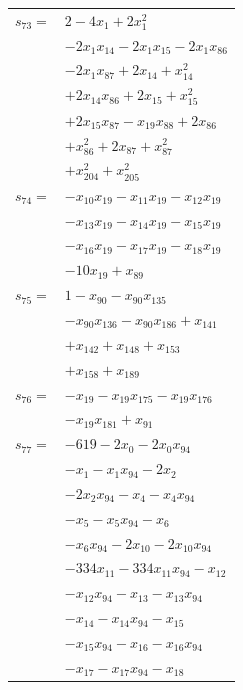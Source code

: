 \begin{longtable}{@{}r@{\;}l@{}}
\(s_{73}=\) & \(\displaystyle 2 -4x_{1} +2x_{1}^{2}\) \\
 & \(\displaystyle -2x_{1}x_{14} -2x_{1}x_{15} -2x_{1}x_{86}\) \\
 & \(\displaystyle -2x_{1}x_{87} +2x_{14} +x_{14}^{2}\) \\
 & \(\displaystyle +2x_{14}x_{86} +2x_{15} +x_{15}^{2}\) \\
 & \(\displaystyle +2x_{15}x_{87} -x_{19}x_{88} +2x_{86}\) \\
 & \(\displaystyle +x_{86}^{2} +2x_{87} +x_{87}^{2}\) \\
 & \(\displaystyle +x_{204}^{2} +x_{205}^{2}\) \\[3pt]
\(s_{74}=\) & \(\displaystyle -x_{10}x_{19} -x_{11}x_{19} -x_{12}x_{19}\) \\
 & \(\displaystyle -x_{13}x_{19} -x_{14}x_{19} -x_{15}x_{19}\) \\
 & \(\displaystyle -x_{16}x_{19} -x_{17}x_{19} -x_{18}x_{19}\) \\
 & \(\displaystyle -10x_{19} +x_{89}\) \\[3pt]
\(s_{75}=\) & \(\displaystyle 1 -x_{90} -x_{90}x_{135}\) \\
 & \(\displaystyle -x_{90}x_{136} -x_{90}x_{186} +x_{141}\) \\
 & \(\displaystyle +x_{142} +x_{148} +x_{153}\) \\
 & \(\displaystyle +x_{158} +x_{189}\) \\[3pt]
\(s_{76}=\) & \(\displaystyle -x_{19} -x_{19}x_{175} -x_{19}x_{176}\) \\
 & \(\displaystyle -x_{19}x_{181} +x_{91}\) \\[3pt]
\(s_{77}=\) & \(\displaystyle -619 -2x_{0} -2x_{0}x_{94}\) \\
 & \(\displaystyle -x_{1} -x_{1}x_{94} -2x_{2}\) \\
 & \(\displaystyle -2x_{2}x_{94} -x_{4} -x_{4}x_{94}\) \\
 & \(\displaystyle -x_{5} -x_{5}x_{94} -x_{6}\) \\
 & \(\displaystyle -x_{6}x_{94} -2x_{10} -2x_{10}x_{94}\) \\
 & \(\displaystyle -334x_{11} -334x_{11}x_{94} -x_{12}\) \\
 & \(\displaystyle -x_{12}x_{94} -x_{13} -x_{13}x_{94}\) \\
 & \(\displaystyle -x_{14} -x_{14}x_{94} -x_{15}\) \\
 & \(\displaystyle -x_{15}x_{94} -x_{16} -x_{16}x_{94}\) \\
 & \(\displaystyle -x_{17} -x_{17}x_{94} -x_{18}\) \\

\end{longtable}
